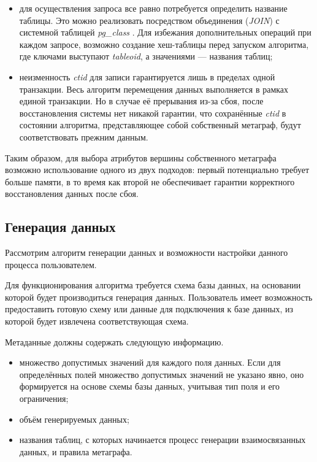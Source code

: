 \begin{itemize}
  \item для осуществления запроса все равно потребуется определить название таблицы. Это можно реализовать посредством объединения (\textit{JOIN}) с системной таблицей \textit{pg\_class} \cite{pg-class}. Для избежания дополнительных операций при каждом запросе, возможно создание хеш-таблицы перед запуском алгоритма, где ключами выступают \textit{tableoid}, а значениями — названия таблиц;
  \item  неизменность \textit{ctid} для записи гарантируется лишь в пределах одной транзакции. Весь алгоритм перемещения данных выполняется в рамках единой транзакции. Но в случае её прерывания из-за сбоя, после восстановления системы нет никакой гарантии, что сохранённые \textit{ctid} в состоянии алгоритма, представляющее собой собственный метаграф, будут соответствовать прежним данным.
\end{itemize}

Таким образом, для выбора атрибутов вершины собственного метаграфа возможно использование одного из двух подходов: первый потенциально требует больше памяти, в то время как второй не обеспечивает гарантии корректного восстановления данных после сбоя.

\subsection{Генерация данных}
Рассмотрим алгоритм генерации данных и возможности настройки данного процесса пользователем.

Для функционирования алгоритма требуется схема базы данных, на основании которой будет производиться генерация данных. Пользователь имеет возможность предоставить готовую схему или данные для подключения к базе данных, из которой будет извлечена соответствующая схема.

Метаданные должны содержать следующую информацию.
\begin{itemize}
  \item множество допустимых значений для каждого поля данных. Если для определённых полей множество допустимых значений не указано явно, оно формируется на основе схемы базы данных, учитывая тип поля и его ограничения;
  \item объём генерируемых данных;
  \item названия таблиц, с которых начинается процесс генерации взаимосвязанных данных, и правила метаграфа.
\end{itemize}

